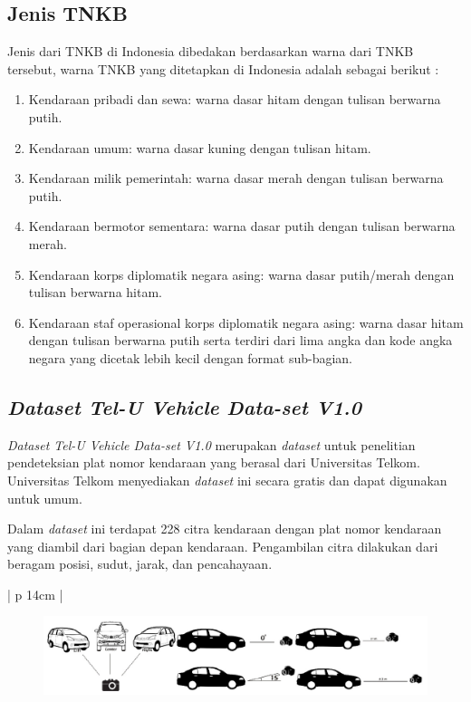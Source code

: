 \subsection{Jenis TNKB}
\noindent Jenis dari TNKB di Indonesia dibedakan berdasarkan warna dari TNKB tersebut, warna TNKB yang ditetapkan di Indonesia adalah sebagai berikut \cite{polri}:
\begin{enumerate}
\item Kendaraan pribadi dan sewa: warna dasar hitam dengan tulisan berwarna putih.
\item Kendaraan umum: warna dasar kuning dengan tulisan hitam.
\item Kendaraan milik pemerintah: warna dasar merah dengan tulisan berwarna putih.
\item Kendaraan bermotor sementara: warna dasar putih dengan tulisan berwarna merah.
\item Kendaraan korps diplomatik negara asing: warna dasar putih/merah dengan tulisan berwarna hitam.
\item Kendaraan staf operasional korps diplomatik negara asing: warna dasar hitam dengan tulisan berwarna putih serta terdiri dari lima angka dan kode angka negara yang dicetak lebih kecil dengan format sub-bagian.\\
\end{enumerate}

\subsection{\textit{Dataset Tel-U Vehicle Data-set V1.0}}
\noindent \textit{Dataset Tel-U Vehicle Data-set V1.0} merupakan \textit{dataset} untuk penelitian pendeteksian plat nomor kendaraan yang berasal dari Universitas Telkom. Universitas Telkom menyediakan \textit{dataset} ini secara gratis dan dapat digunakan untuk umum.

\noindent Dalam \textit{dataset} ini terdapat 228 citra kendaraan dengan plat nomor kendaraan yang diambil dari bagian depan kendaraan. Pengambilan citra dilakukan dari beragam posisi, sudut, jarak, dan pencahayaan.

\begin{table}[H]
	\small
	\begin{adjustbox}{width=1\textwidth}
		\begin{tabular}{| p {14cm} |}
			\hline
			\begin{figure}[H]
				\centering
				\includegraphics[width=14cm]{images/PengambilanCitra.png}
			\end{figure} \\
			\hline
		\end{tabular}
	\end{adjustbox}
	\label{fig:IlustrasiProsesPengambilanCitraDataset}
\end{table}

